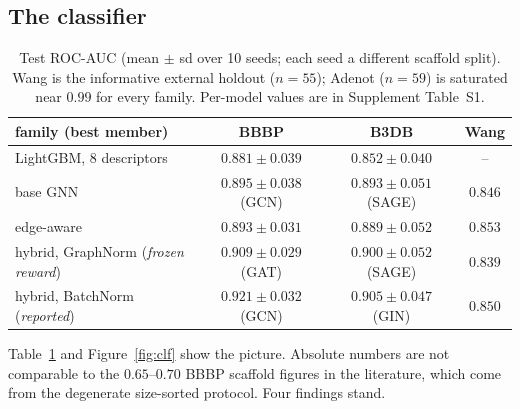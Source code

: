 \documentclass[10pt,letterpaper]{article}
\begin{document}
\subsection{The classifier}\label{sec:clf}
\begin{table}[t]
\centering
\caption{Test ROC-AUC (mean $\pm$ sd over 10 seeds; each seed a different scaffold split). Wang is the informative external holdout ($n=55$); Adenot ($n=59$) is saturated near $0.99$ for every family. Per-model values are in Supplement Table~S1.}
\label{tab:auc}
\begin{tabular}{@{}lccc@{}}\toprule
family (best member) & BBBP & B3DB & Wang\\\midrule
LightGBM, 8 descriptors & $0.881\pm0.039$ & $0.852\pm0.040$ & --\\
base GNN & $0.895\pm0.038$ (GCN) & $0.893\pm0.051$ (SAGE) & $0.846$\\
edge-aware & $0.893\pm0.031$ & $0.889\pm0.052$ & $0.853$\\
hybrid, GraphNorm (\emph{frozen reward}) & $0.909\pm0.029$ (GAT) & $0.900\pm0.052$ (SAGE) & $0.839$\\
hybrid, BatchNorm (\emph{reported}) & $\mathbf{0.921\pm0.032}$ (GCN) & $\mathbf{0.905\pm0.047}$ (GIN) & $0.850$\\\bottomrule
\end{tabular}
\end{table}
Table~\ref{tab:auc} and Figure~\ref{fig:clf} show the picture. Absolute numbers are not comparable to the $0.65$--$0.70$ BBBP scaffold figures in the literature, which come from the degenerate size-sorted protocol. Four findings stand.
\end{document}
